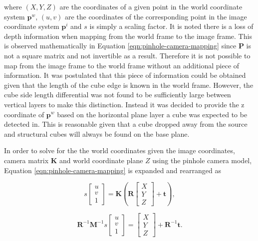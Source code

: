 where $(X,Y,Z)$ are the coordinates of a given point in the world coordinate system $\boldsymbol{p}^w$, $(u,v)$ are the coordinates of the corresponding point in the image coordinate system $\boldsymbol{p}^i$ and $s$ is simply a scaling factor. It is noted there is a loss of depth information when mapping from the world frame to the image frame. This is observed mathematically in Equation \ref{eqn:pinhole-camera-mapping} since $\textbf{P}$ is not a square matrix and not invertible as a result. Therefore it is not possible to map from the image frame to the world frame without an additional piece of information. It was postulated that this piece of information could be obtained given that the length of the cube edge is known in the world frame. However, the cube side length differential was not found to be sufficiently large between vertical layers to make this distinction. Instead it was decided to provide the z coordinate of $\boldsymbol{p}^w$ based on the horizontal plane layer a cube was expected to be detected in. This is reasonable given that a cube dropped away from the source and structural cubes will always be found on the base plane.

In order to solve for the the world coordinates given the image coordinates, camera matrix $\textbf{K}$ and world coordinate plane $Z$ using the pinhole camera model, Equation \ref{eqn:pinhole-camera-mapping} is expanded and rearranged as

\begin{equation}
	s
	\begin{bmatrix}
		u \\ 
		v \\ 
		1
	\end{bmatrix}
	=
	\textbf{K}\left(\textbf{R}
	\begin{bmatrix}
		X \\ 
		Y \\ 
		Z
	\end{bmatrix}
	+ \textbf{t}\right),
	\label{eqn:expanded-pinhole-camera-mapping1}
\end{equation}

\begin{equation}
	\textbf{R}^{-1}\textbf{M}^{-1}
	s
	\begin{bmatrix}
		u \\ 
		v \\ 
		1
	\end{bmatrix}
	=
	\begin{bmatrix}
		X \\ 
		Y \\ 
		Z
	\end{bmatrix}
	+ \textbf{R}^{-1}\textbf{t}.
	\label{eqn:expanded-pinhole-camera-mapping2}
\end{equation}

